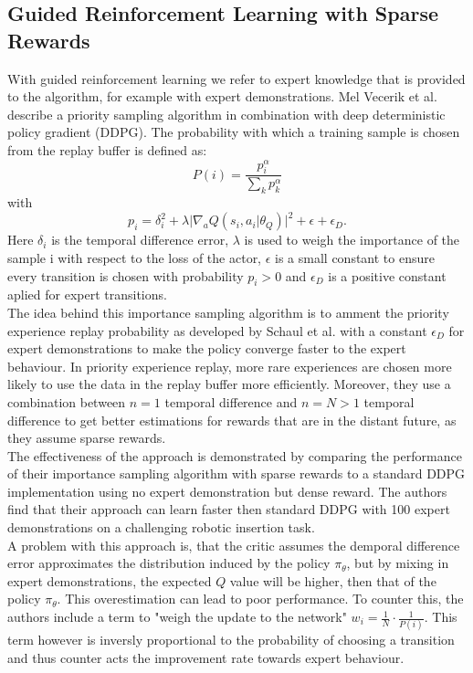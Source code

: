 \subsection{Guided Reinforcement Learning with Sparse Rewards}
With guided reinforcement learning we refer to expert knowledge that is provided to the algorithm, for example with expert demonstrations.
Mel Vecerik et al. \cite{vecerik2018leveraging} describe a priority 
sampling algorithm in combination with deep deterministic policy gradient (DDPG). The probability with which a 
training sample is chosen from the replay buffer is defined as: 
\begin{equation}
    P(i) = \frac{p_i^\alpha}{\sum\limits_{k} p_k^\alpha}
\end{equation}
with 
\begin{equation}
    p_i = \delta_{i}^2 + \lambda \lvert \nabla_a Q(s_i, a_i \vert \theta_Q) \rvert^2 + \epsilon + \epsilon_{D}.
\end{equation}
Here $\delta_{i}$ is the temporal difference error, $\lambda$ is used to weigh the importance of the sample i with respect to the loss of the actor, 
$\epsilon$ is a small constant to ensure every transition is chosen with probability $p_i > 0$ and $\epsilon_D$ is a positive constant aplied for expert transitions.\\
The idea behind this importance sampling algorithm is to amment the priority experience replay probability as developed by Schaul et al. \cite{schaul2016prioritized} 
with a constant $\epsilon_{D}$ for expert demonstrations to make the policy converge faster to the expert behaviour. In priority experience replay, more rare 
experiences are chosen more likely to use the data in the replay buffer more efficiently. Moreover, they use a combination between $n=1$ temporal difference and 
$n=N > 1$ temporal difference to get better estimations for rewards that are in the distant future, as they assume sparse rewards.\\
The effectiveness of the approach is demonstrated by comparing the performance of their importance sampling algorithm with sparse rewards to a standard DDPG 
implementation using no expert demonstration but dense reward. The authors find that their approach can learn faster then standard DDPG with 100 expert 
demonstrations on a challenging robotic insertion task.\\ 
A problem with this approach is, that the critic assumes the demporal difference error approximates the distribution induced by the policy $\pi_{\theta}$, but by 
mixing in expert demonstrations, the expected $Q$ value will be higher, then that of the policy $\pi_{\theta}$. This overestimation can lead to poor performance. 
To counter this, the authors include a term to "weigh the update to the network" $w_i = \frac{1}{N} \cdot \frac{1}{P(i)}$. This term however is inversly proportional to the 
probability of choosing a transition and thus counter acts the improvement rate towards expert behaviour. 

